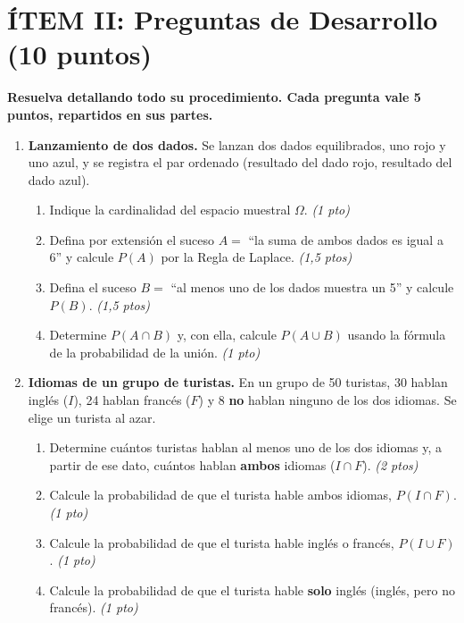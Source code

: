 \documentclass[12pt, a4paper]{article} %
\begin{document}
\newpage

\section*{ÍTEM II: Preguntas de Desarrollo (10 puntos)}
\vspace{0.2cm}
\textbf{Resuelva detallando todo su procedimiento. Cada pregunta vale 5 puntos, repartidos en sus partes.}
\vspace{0.4cm}

\begin{enumerate}[leftmargin=*]

    \item \textbf{Lanzamiento de dos dados.} Se lanzan dos dados equilibrados, uno rojo y uno azul, y se registra el par ordenado (resultado del dado rojo, resultado del dado azul).
    \begin{enumerate}[label=\alph*), topsep=4pt, itemsep=3pt]
        \item Indique la cardinalidad del espacio muestral $\Omega$. \hfill \textit{(1 pto)}
        \item Defina por extensión el suceso $A = $ ``la suma de ambos dados es igual a 6'' y calcule $P(A)$ por la Regla de Laplace. \hfill \textit{(1,5 ptos)}
        \item Defina el suceso $B = $ ``al menos uno de los dados muestra un 5'' y calcule $P(B)$. \hfill \textit{(1,5 ptos)}
        \item Determine $P(A \cap B)$ y, con ella, calcule $P(A \cup B)$ usando la fórmula de la probabilidad de la unión. \hfill \textit{(1 pto)}
    \end{enumerate}
    \vspace{9cm}

    \newpage

    \item \textbf{Idiomas de un grupo de turistas.} En un grupo de 50 turistas, 30 hablan inglés ($I$), 24 hablan francés ($F$) y 8 \textbf{no} hablan ninguno de los dos idiomas. Se elige un turista al azar.
    \begin{enumerate}[label=\alph*), topsep=4pt, itemsep=3pt]
        \item Determine cuántos turistas hablan al menos uno de los dos idiomas y, a partir de ese dato, cuántos hablan \textbf{ambos} idiomas ($I \cap F$). \hfill \textit{(2 ptos)}
        \item Calcule la probabilidad de que el turista hable ambos idiomas, $P(I \cap F)$. \hfill \textit{(1 pto)}
        \item Calcule la probabilidad de que el turista hable inglés o francés, $P(I \cup F)$. \hfill \textit{(1 pto)}
        \item Calcule la probabilidad de que el turista hable \textbf{solo} inglés (inglés, pero no francés). \hfill \textit{(1 pto)}
    \end{enumerate}
    \vspace{9cm}

\end{enumerate}
\end{document}
